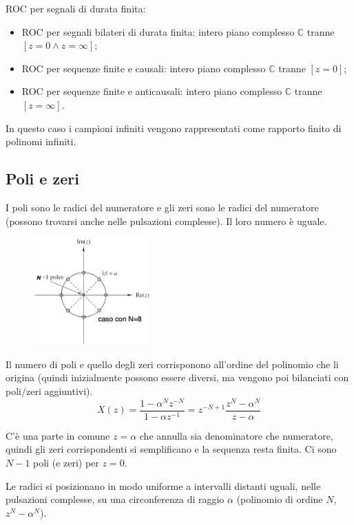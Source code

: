 ROC per segnali di durata finita:
\begin{itemize}
	\item ROC per segnali bilateri di durata finita: intero piano complesso $\mathbb{C}$ tranne $[z = 0 \land z = \infty]$;
	\item ROC per sequenze finite e causali: intero piano complesso $\mathbb{C}$ tranne $[z = 0]$;
	\item ROC per sequenze finite e anticausali: intero piano complesso $\mathbb{C}$ tranne $[z = \infty]$.
\end{itemize}
In questo caso i campioni infiniti vengono rappresentati come rapporto finito di polinomi infiniti.

\newpage
\subsection{Poli e zeri}
I poli sono le radici del numeratore e gli zeri sono le radici del numeratore (possono trovarsi anche nelle pulsazioni complesse). Il loro numero è uguale.

 \begin{figure}
 	\includegraphics[width=0.4\textwidth]{Lezioni/Immagini/circonferenza}
 	\vspace{-40pt}
 \end{figure}

Il numero di poli e quello degli zeri corrisponono all'ordine del polinomio che li origina (quindi inizialmente possono essere diversi, ma vengono poi bilanciati con poli/zeri aggiuntivi).
$$X(z) = \frac{1 - \alpha^Nz^{-N}}{1 - \alpha z^{-1}} = z^{-N+1} \frac{z^N - \alpha^N}{z - \alpha}$$

C'è una parte in comune $z = \alpha$ che annulla sia denominatore che numeratore, quindi gli zeri corrispondenti si semplificano e la sequenza resta finita. Ci sono $N - 1$ poli (e zeri) per $z = 0$.

Le radici si posizionano in modo uniforme a intervalli distanti uguali, nelle pulsazioni complesse, su una circonferenza di raggio $\alpha$ (polinomio di ordine $N$, $z^N - \alpha^N$).

